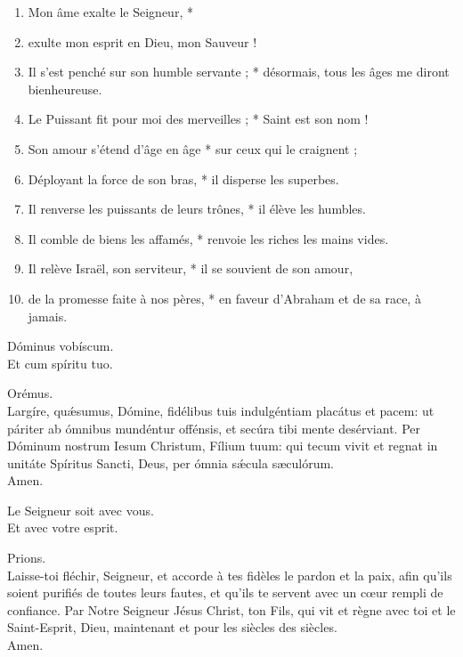 \documentclass[twoside]{article}
\begin{document}
\begin{paracol}[1]{2}
\switchcolumn
\begin{enumerate}[wide, itemsep=0mm, labelwidth=!, labelindent=0pt, label=\color{gregoriocolor}\theenumi]
\item Mon âme exalte le Seigneur, *
\item exulte mon esprit en Dieu, mon Sauveur !
\item Il s'est penché sur son humble servante ; * désormais, tous les âges me diront bienheureuse.
\item Le Puissant fit pour moi des merveilles ; * Saint est son nom !
\item Son amour s'étend d'âge en âge * sur ceux qui le craignent ;
\item Déployant la force de son bras, * il disperse les superbes.
\item Il renverse les puissants de leurs trônes, * il élève les humbles.
\item Il comble de biens les affamés, * renvoie les riches les mains vides.
\item Il relève Israël, son serviteur, * il se souvient de son amour,
\item de la promesse faite à nos pères, * en faveur d'Abraham et de sa race, à jamais.
\end{enumerate}
\newpage
\switchcolumn*

\vv Dóminus vobíscum. \\
\rr Et cum spíritu tuo.

Orémus.\\
Largíre, quǽsumus, Dómine, fidélibus tuis indulgéntiam placátus et pacem: ut páriter ab ómnibus mundéntur offénsis, et secúra tibi mente desérviant.
Per Dóminum nostrum Iesum Christum, Fílium tuum: qui tecum vivit et regnat in unitáte Spíritus Sancti, Deus, per ómnia sǽcula sæculórum. \\
\rr Amen.

\switchcolumn

\vv Le Seigneur soit avec vous. \\
\rr Et avec votre esprit.

Prions. \\
Laisse-toi fléchir, Seigneur, et accorde à tes fidèles le pardon et la paix, afin qu’ils soient purifiés de toutes leurs fautes, et qu’ils te servent avec un cœur rempli de confiance.
Par Notre Seigneur Jésus Christ, ton Fils, qui vit et règne avec toi et le Saint-Esprit, Dieu, maintenant et pour les siècles des siècles.\\
\rr Amen.

\switchcolumn*


\end{paracol}
\end{document}
